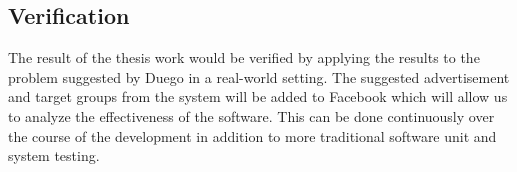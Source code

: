 \documentclass[a4paper]{article}
\begin{document}
\subsection{Verification}
The result of the thesis work would be verified by applying the results to the problem suggested by Duego in a real-world setting.
 The suggested advertisement and target groups from the system will be added to Facebook which will allow us to analyze the
 effectiveness of the software. This can be done continuously over the course of the development in addition to more traditional
 software unit and system testing.


\end{document}
